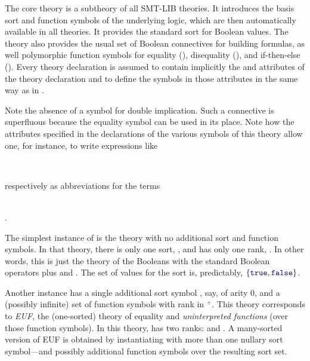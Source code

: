 The core theory is a subtheory of all SMT-LIB theories.
It introduces the basis sort and function symbols of the underlying logic,
which are then automatically available in all theories.
It provides the standard  sort for Boolean values.
The theory also provides the usual set of Boolean connectives for building formulas,
as well polymorphic function symbols for equality (\ter{=}), disequality (), and
if-then-else ().
Every theory declaration is assumed 
to contain implicitly the  and  attributes 
of the  theory declaration and 
to define the symbols in those attributes in the same way as in .




Note the absence of a symbol for double implication.
Such a connective is superfluous 
because the equality symbol \ter{=} can be used in its place. 
Note how the attributes specified in the declarations of the various symbols
of this theory allow one, for instance, to write expressions like 

\begin{center}
\qquad {}
\qquad {} \\
\end{center}

\noindent respectively as abbreviations for the terms

\begin{center}
\qquad {}
\qquad {} \\
\qquad {} .
\end{center}


The simplest instance of  is the theory with no additional sort
and function symbols.
In that theory, there is only one sort, ,
and  has only one rank, .
In other words, this is just the theory of the Booleans with the standard Boolean operators
plus  and .
The set of values for the  sort is, predictably, $\{\ter{true},\ter{false}\}$.

Another instance has a single additional sort symbol , say, 
of arity 0, and a (possibly infinite) set of function symbols 
with rank in $\!^+$.
This theory corresponds to \emph{EUF}, 
the (one-sorted) theory of equality and \emph{uninterpreted functions}
(over those function symbols).
In this theory,  has two ranks:
 and .
A many-sorted version of EUF is obtained by instantiating 
with more than one nullary sort symbol---and possibly additional
function symbols over the resulting sort set. 

